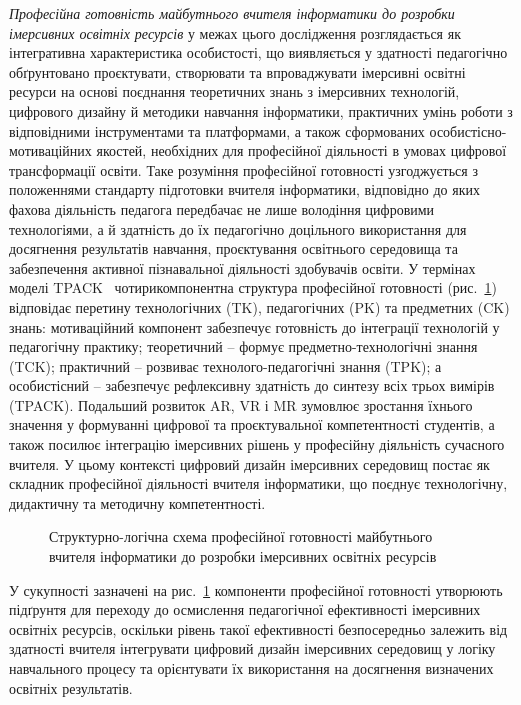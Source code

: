 \emph{Професійна готовність майбутнього вчителя інформатики до розробки імерсивних освітніх ресурсів} у межах цього дослідження розглядається як інтегративна характеристика особистості, що виявляється у здатності педагогічно обґрунтовано проєктувати, створювати та впроваджувати імерсивні освітні ресурси на основі поєднання теоретичних знань з імерсивних технологій, цифрового дизайну й методики навчання інформатики, практичних умінь роботи з відповідними інструментами та платформами, а також сформованих особистісно-мотиваційних якостей, необхідних для професійної діяльності в умовах цифрової трансформації освіти. Таке розуміння професійної готовності узгоджується з положеннями стандарту підготовки вчителя інформатики, відповідно до яких фахова діяльність педагога передбачає не лише володіння цифровими технологіями, а й здатність до їх педагогічно доцільного використання для досягнення результатів навчання, проєктування освітнього середовища та забезпечення активної пізнавальної діяльності здобувачів освіти. У термінах моделі TPACK~\cite{BeldaMedina2022TPACK} чотирикомпонентна структура професійної готовності (рис.~\ref{fig:1.6}) відповідає перетину технологічних (TK), педагогічних (PK) та предметних (CK) знань: мотиваційний компонент забезпечує готовність до інтеграції технологій у педагогічну практику; теоретичний -- формує предметно-технологічні знання (TCK); практичний -- розвиває технолого-педагогічні знання (TPK); а особистісний -- забезпечує рефлексивну здатність до синтезу всіх трьох вимірів (TPACK). Подальший розвиток AR, VR і MR зумовлює зростання їхнього значення у формуванні цифрової та проєктувальної компетентності студентів, а також посилює інтеграцію імерсивних рішень у професійну діяльність сучасного вчителя. У цьому контексті цифровий дизайн імерсивних середовищ постає як складник професійної діяльності вчителя інформатики, що поєднує технологічну, дидактичну та методичну компетентності.

\begin{figure}[!h]
\centering

\caption{Структурно-логічна схема професійної готовності майбутнього вчителя інформатики до розробки імерсивних освітніх ресурсів}
\label{fig:1.6}
\end{figure}

У сукупності зазначені на рис.~\ref{fig:1.6} компоненти професійної готовності утворюють підґрунтя для переходу до осмислення педагогічної ефективності імерсивних освітніх ресурсів, оскільки рівень такої ефективності безпосередньо залежить від здатності вчителя інтегрувати цифровий дизайн імерсивних середовищ у логіку навчального процесу та орієнтувати їх використання на досягнення визначених освітніх результатів.

